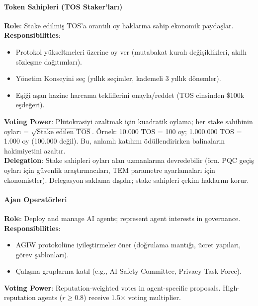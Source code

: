 \documentclass[11pt]{article}
\begin{document}
\begin{itemize}[noitemsep]
\begin{itemize}[noitemsep]
\begin{itemize}[noitemsep]
\begin{itemize}[noitemsep]
\begin{itemize}[noitemsep]
\begin{itemize}[noitemsep]
\begin{itemize}[noitemsep]
\begin{enumerate}[noitemsep]
\begin{itemize}[noitemsep]
\paragraph{Token Sahipleri (TOS Staker'ları)}
\textbf{Role}: Stake edilmiş TOS'a orantılı oy haklarına sahip ekonomik paydaşlar.\\
\textbf{Responsibilities}:
\begin{itemize}[noitemsep]
  \item Protokol yükseltmeleri üzerine oy ver (mutabakat kuralı değişiklikleri, akıllı sözleşme dağıtımları).
  \item Yönetim Konseyini seç (yıllık seçimler, kademeli 3 yıllık dönemler).
  \item Eşiği aşan hazine harcama tekliflerini onayla/reddet (TOS cinsinden \$100k eşdeğeri).
\end{itemize}
\textbf{Voting Power}: Plütokrasiyi azaltmak için kuadratik oylama; her stake sahibinin oyları = $\sqrt{\text{Stake edilen TOS}}$. Örnek: 10.000 TOS = 100 oy; 1.000.000 TOS = 1.000 oy (100.000 değil). Bu, anlamlı katılımı ödüllendirirken balinaların hakimiyetini azaltır.\\
\textbf{Delegation}: Stake sahipleri oyları alan uzmanlarına devredebilir (örn. PQC geçiş oyları için güvenlik araştırmacıları, TEM parametre ayarlamaları için ekonomistler). Delegasyon saklama dışıdır; stake sahipleri çekim haklarını korur.

\paragraph{Ajan Operatörleri}
\textbf{Role}: Deploy and manage AI agents; represent agent interests in governance.\\
\textbf{Responsibilities}:
\begin{itemize}[noitemsep]
  \item AGIW protokolüne iyileştirmeler öner (doğrulama mantığı, ücret yapıları, görev şablonları).
  \item Çalışma gruplarına katıl (e.g., AI Safety Committee, Privacy Task Force).
\end{itemize}
\textbf{Voting Power}: Reputation-weighted votes in agent-specific proposals. High-reputation agents ($r \geq 0.8$) receive 1.5$\times$ voting multiplier.


\end{itemize}
\end{enumerate}
\end{itemize}
\end{itemize}
\end{itemize}
\end{itemize}
\end{itemize}
\end{itemize}
\end{itemize}
\end{document}
